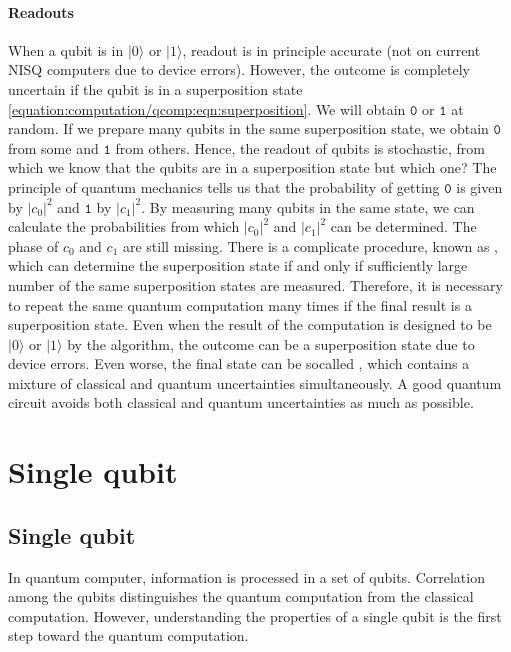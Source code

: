 \documentclass[letterpaper,10pt,english]{jupyterBook}
\begin{document}
\subsection{Readouts}
\label{\detokenize{computation/qcomp:readouts}}
\sphinxAtStartPar
When a qubit is in \(\lvert 0 \rangle\) or \(\lvert 1 \rangle\), readout is in principle accurate (not on current NISQ computers due to device errors). However, the outcome is completely uncertain if the qubit is in a superposition state \eqref{equation:computation/qcomp:eqn:superposition}. We will obtain \(\texttt{0}\) or \(\texttt{1}\) at random.  If we prepare many qubits in the same superposition state, we obtain \(\texttt{0}\) from some and \(\texttt{1}\) from others. Hence, the readout of qubits is stochastic, from which we know that the qubits are in a superposition state but which one?  The principle of quantum mechanics tells us that the probability of getting \(\texttt{0}\) is given by \(|c_0|^2\) and \(\texttt{1}\) by \(|c_1|^2\).  By measuring many qubits in the same state, we can calculate the probabilities from which \(|c_0|^2\) and \(|c_1|^2\) can be determined.  The phase of \(c_0\) and \(c_1\) are still missing.  There is a complicate procedure, known as , which can determine the superposition state if and only if sufficiently large number of the same superposition states are measured.  Therefore, it is necessary to repeat the same quantum computation many times if the final result is a superposition state.  Even when the result of the computation is designed to be \(\lvert 0 \rangle\) or \(\lvert 1 \rangle\) by the algorithm, the outcome can be a superposition state due to device errors.  Even worse, the final state can be so\sphinxhyphen{}called , which contains a mixture of classical and quantum uncertainties simultaneously.  A good quantum circuit avoids both classical and quantum uncertainties as much as possible.

\sphinxstepscope


\part{Single qubit}

\sphinxstepscope


\chapter{Single qubit}
\label{\detokenize{qubit/intro:single-qubit}}\label{\detokenize{qubit/intro:chap-qubit1}}\label{\detokenize{qubit/intro::doc}}
\sphinxAtStartPar
In quantum computer, information is processed in a set of qubits.  Correlation among the qubits distinguishes the quantum computation from the classical computation.  However, understanding the properties of a single qubit is the first step toward the quantum computation.
\end{document}

